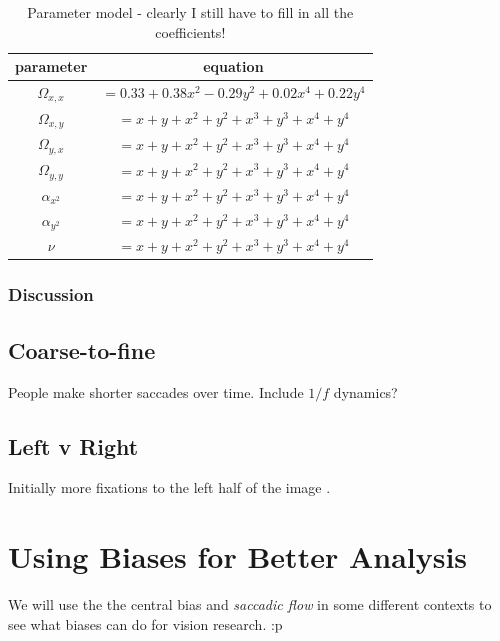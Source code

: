 \documentclass[a4paper, onecolumn, oneside, 11pt]{article}
\begin{document}
\begin{table}
\centering

\begin{tabular}{c c}

parameter & equation \\
\hline
$\Omega_{x,x}$	& $= 0.33+ 0.38x^2 -0.29y^2 + 0.02x^4 + 0.22y^4$ \\ 
$\Omega_{x,y}$	& $=x + y + x^2 + y^2 + x^3 + y^3 + x^4 + y^4$ \\ 
$\Omega_{y,x}$	& $=x + y + x^2 + y^2 + x^3 + y^3 + x^4 + y^4$ \\ 
$\Omega_{y,y}$	& $=x + y + x^2 + y^2 + x^3 + y^3 + x^4 + y^4$ \\ 
\hline
$\alpha_{x^2}$		& $=x + y + x^2 + y^2 + x^3 + y^3 + x^4 + y^4$ \\ 
$\alpha_{y^2}$		& $=x + y + x^2 + y^2 + x^3 + y^3 + x^4 + y^4$ \\ 
\hline
$\nu$			& $=x + y + x^2 + y^2 + x^3 + y^3 + x^4 + y^4$ \\ 
\end{tabular}

\caption{Parameter model - clearly I still have to fill in all the coefficients!}
\label{tab:paramModel}
\end{table}

\subsubsection{Discussion}



\subsection{Coarse-to-fine}

People make shorter saccades over time. Include $1/f$ dynamics? 

\subsection{Left v Right}

Initially more fixations to the left half of the image \citep{nuthmann-matthias2014}.

\section{Using Biases for Better Analysis}

We will use the the central bias \citep{clarke-tatler2014} and \textit{saccadic flow} in some different contexts to see what biases can do for vision research. :p
\end{document}
